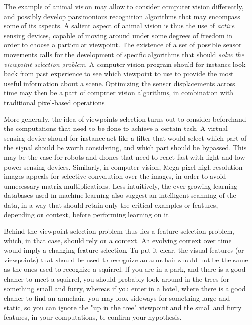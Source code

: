 \documentclass{article} %
\begin{document}
	The example of animal vision may allow to consider computer vision differently, and possibly develop parsimonious recognition algorithms that may encompass some of its aspects. A salient aspect of animal vision is thus the use of \emph{active} sensing devices, capable of moving around under some degrees of freedom in order to choose a particular viewpoint. The existence of a set of possible sensor movements calls for the development of specific algorithms that should \emph{solve the viewpoint selection problem}. A computer vision program should for instance look back from past experience to see which viewpoint to use to provide the most useful information about a scene. Optimizing the sensor displacements across time may then be a part of computer vision algorithms, in combination with traditional pixel-based operations. 
	
	More generally, the idea of viewpoints selection turns out to consider beforehand the computations that need to be done to achieve a certain task. A virtual sensing device should for instance act like a filter that would select which part of the signal should be worth considering, and which part should be bypassed.  
	This may be the case for robots and drones  that need to react fast with light and low-power sensing devices. Similarly, in computer vision, Mega-pixel high-resolution images appeals for selective convolution over the images, in order to avoid unnecessary matrix multiplications. Less intuitively, the ever-growing  learning databases used in machine learning also suggest an intelligent scanning of the data, in a way that should retain only the critical examples or features, depending on context, before performing learning on it.  
	
	Behind the viewpoint selection problem thus lies a feature selection problem, which, in that case, should rely on a context. An evolving context over time would imply a changing feature selection. Tu put it clear, the visual features (or viewpoints) that should be used to recognize an armchair should not  be the same as the ones used to recognize a squirrel. If you are in a park, and there is a good chance to meet a squirrel, you should probably look around in the trees for something small and furry, whereas if you enter in a hotel, where there is a good chance to find an armchair, you may look sideways for something large and static, so you can ignore the "up in the tree" viewpoint and the small and furry features, in your computations, to confirm your hypothesis.
	
	
	
\end{document}
